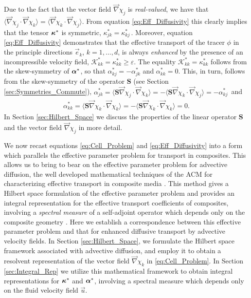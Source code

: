\documentclass[11pt]{amsart}
\newcommand{\Sb}{\mathbf{S}}
\newcommand{\Kc}{\mathcal{K}}
\newcommand\balpha{\mbox{\boldmath${\alpha}$}}
\newcommand\bkappa{\mbox{\boldmath${\kappa}$}}
\begin{document}
Due to the fact that the vector field
$\vec{\nabla}\chi_j$ is \emph{real-valued}, we have that
$\langle\vec{\nabla}\chi_j\cdot\vec{\nabla}\chi_k\rangle=\langle\vec{\nabla}\chi_k\cdot\vec{\nabla}\chi_j\rangle$. From equation
\eqref{eq:Eff_Diffusivity} this clearly implies that the tensor    
$\bkappa^*$ is symmetric, $\kappa^*_{jk}=\kappa^*_{kj}\,$. Moreover, equation
\eqref{eq:Eff_Diffusivity} demonstrates that the effective transport
of the tracer $\phi$ in the principle directions $\vec{e}_k$, $k=1,\ldots,d$,
is always \emph{enhanced} by the presence of an incompressible velocity
field, $\Kc^*_{kk}=\kappa^*_{kk}\geq\varepsilon$. The equality $\Kc^*_{kk}=\kappa^*_{kk}$
follows from the skew-symmetry of $\balpha^*$, so that
$\alpha^*_{kj}=-\alpha^*_{jk}$ and $\alpha^*_{kk}=0$. This, in turn, follows from the
skew-symmetry of the operator $\Sb$ (see Section
\ref{sec:Symmetries_Commute}),
$\alpha^*_{jk}=\langle\Sb\vec{\nabla}\chi_j\cdot\vec{\nabla}\chi_k\rangle=-\langle\Sb\vec{\nabla}\chi_k\cdot\vec{\nabla}\chi_j\rangle=-\alpha^*_{kj}\,$ 
and 
%
\begin{align}\label{eq:Sb_Skew}
  \alpha^*_{kk}=\langle\Sb\vec{\nabla}\chi_k\cdot\vec{\nabla}\chi_k\rangle=-\langle\Sb\vec{\nabla}\chi_k\cdot\vec{\nabla}\chi_k\rangle=0.  
\end{align}
%
In Section \ref{sec:Hilbert_Space} we discuss the properties of the
linear operator $\Sb$ and the vector field $\vec{\nabla}\chi_j$ in more detail.





We now recast equations \eqref{eq:Cell_Problem} and
\eqref{eq:Eff_Diffusivity} into a form which parallels the effective
parameter problem for transport in composites. This allows us to
bring to bear on the effective parameter problem for advective
diffusion, the well developed mathematical techniques of the
ACM for characterizing effective transport in composite media
\cite{Golden:CMP-473,MILTON:2002:TC}. This method gives a Hilbert
space formulation of the effective parameter problem and provides an
integral representation for the effective transport coefficients of
composites, involving a \emph{spectral measure} of a self-adjoint
operator which depends only on the composite geometry
\cite{Golden:CMP-473,Murphy:JMP:063506,MILTON:2002:TC}. Here we
establish a correspondence between this effective parameter problem
and that for enhanced diffusive transport by advective velocity 
fields. In Section \ref{sec:Hilbert_Space}, we formulate the Hilbert
space framework associated with advective diffusion, and employ it to
obtain a resolvent representation of the vector field $\vec{\nabla}\chi_k$ in
\eqref{eq:Cell_Problem}. In Section \ref{sec:Integral_Rep} we utilize
this mathematical framework to obtain integral representations for 
$\bkappa^*$ and $\balpha^*$, involving a spectral measure which depends
only on the fluid velocity field $\vec{u}$.    
\end{document}
